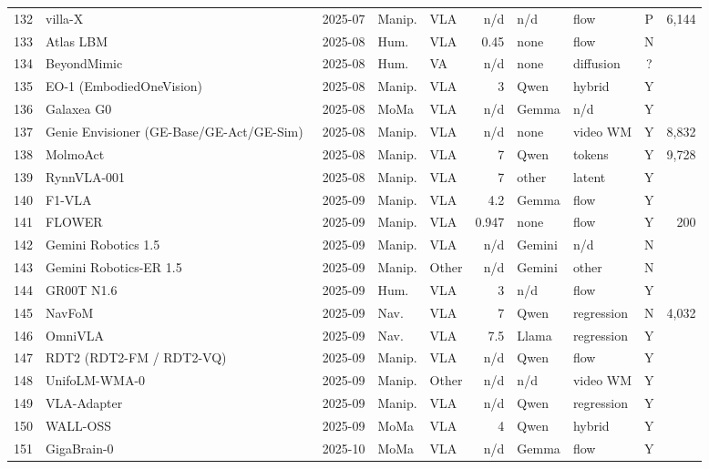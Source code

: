 \begin{longtable}{@{}r p{3.55cm} l l l r l l c r@{}}
132 & villa-X~\cite{ax250723682} & 2025-07 & Manip. & VLA & n/d & n/d & flow & P & 6,144\\
133 & Atlas LBM~\cite{web-atlas-lbm} & 2025-08 & Hum. & VLA & 0.45 & none & flow & N & \\
134 & BeyondMimic~\cite{ax250808241} & 2025-08 & Hum. & VA & n/d & none & diffusion & ? & \\
135 & EO-1 (EmbodiedOneVision)~\cite{ax250821112} & 2025-08 & Manip. & VLA & 3 & Qwen & hybrid & Y & \\
136 & Galaxea G0~\cite{ax250900576} & 2025-08 & MoMa & VLA & n/d & Gemma & n/d & Y & \\
137 & Genie Envisioner (GE-Base/GE-Act/GE-Sim)~\cite{ax250805635} & 2025-08 & Manip. & VLA & n/d & none & video WM & Y & 8,832\\
138 & MolmoAct~\cite{ax250807917} & 2025-08 & Manip. & VLA & 7 & Qwen & tokens & Y & 9,728\\
139 & RynnVLA-001~\cite{ax250915212} & 2025-08 & Manip. & VLA & 7 & other & latent & Y & \\
140 & F1-VLA~\cite{ax250906951} & 2025-09 & Manip. & VLA & 4.2 & Gemma & flow & Y & \\
141 & FLOWER~\cite{ax250904996} & 2025-09 & Manip. & VLA & 0.947 & none & flow & Y & 200\\
142 & Gemini Robotics 1.5~\cite{ax251003342} & 2025-09 & Manip. & VLA & n/d & Gemini & n/d & N & \\
143 & Gemini Robotics-ER 1.5~\cite{ax251003342} & 2025-09 & Manip. & Other & n/d & Gemini & other & N & \\
144 & GR00T N1.6~\cite{web-gr00t-n1-6} & 2025-09 & Hum. & VLA & 3 & n/d & flow & Y & \\
145 & NavFoM~\cite{ax250912129} & 2025-09 & Nav. & VLA & 7 & Qwen & regression & N & 4,032\\
146 & OmniVLA~\cite{ax250919480} & 2025-09 & Nav. & VLA & 7.5 & Llama & regression & Y & \\
147 & RDT2 (RDT2-FM / RDT2-VQ)~\cite{ax260203310} & 2025-09 & Manip. & VLA & n/d & Qwen & flow & Y & \\
148 & UnifoLM-WMA-0~\cite{web-unifolm-wma-0} & 2025-09 & Manip. & Other & n/d & n/d & video WM & Y & \\
149 & VLA-Adapter~\cite{ax250909372} & 2025-09 & Manip. & VLA & n/d & Qwen & regression & Y & \\
150 & WALL-OSS~\cite{ax250911766} & 2025-09 & MoMa & VLA & 4 & Qwen & hybrid & Y & \\
151 & GigaBrain-0~\cite{ax251019430} & 2025-10 & MoMa & VLA & n/d & Gemma & flow & Y & \\

\end{longtable}
